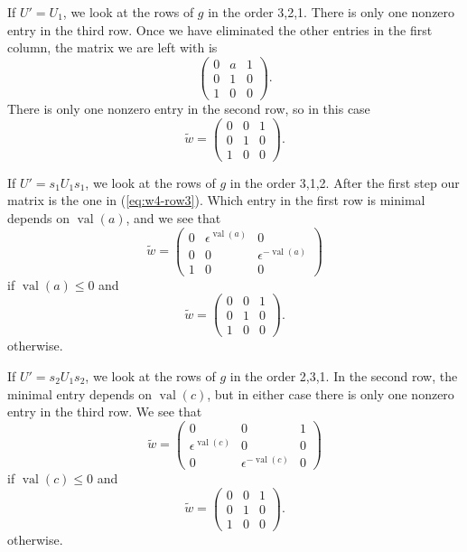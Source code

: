 \documentclass{amsart}
\theoremstyle{definition}
\def\e{\epsilon}
\def\w{\widetilde{w}}
\def\val{\mathop{\mathrm{val}}}
\begin{document}
  If $U' = U_1$, we look at the rows of $g$ in the order 3,2,1.  There is only
  one nonzero entry in the third row.  Once we have eliminated the other
  entries in the first column, the matrix we are left with is
  \begin{equation} \label{eq:w4-row3}
    \begin{pmatrix}
      0 & a & 1 \\ 
      0 & 1 & 0 \\
      1 & 0 & 0
    \end{pmatrix}.
  \end{equation}
  There is only one nonzero entry in the second row, so in this case
  \begin{equation*}\w = \begin{pmatrix}
      0 & 0 & 1 \\
      0 & 1 & 0 \\
      1 & 0 & 0
    \end{pmatrix}.
  \end{equation*}

  If $U' = s_1 U_1 s_1$, we look at the rows of $g$ in the order 3,1,2.  After
  the first step our matrix is the one in (\ref{eq:w4-row3}).  Which entry in
  the first row is minimal depends on $\val(a)$, and we see that
  \begin{equation*}
    \w = \begin{pmatrix}
      0 & \e^{\val(a)} & 0 \\
      0 & 0 & \e^{-\val(a)}  \\
      1 & 0 & 0
    \end{pmatrix}
  \end{equation*}
  if $\val(a) \le 0$ and 
  \begin{equation*}\w = \begin{pmatrix}
      0 & 0 & 1 \\
      0 & 1 & 0 \\
      1 & 0 & 0
    \end{pmatrix}.
  \end{equation*}
  otherwise.
  
  If $U' = s_2 U_1 s_2$, we look at the rows of $g$ in the order 2,3,1.  In the
  second row, the minimal entry depends on $\val(c)$, but in either case there
  is only one nonzero entry in the third row.  We see that
  \begin{equation*}
    \w = \begin{pmatrix}
      0 & 0 & 1 \\
      \e^{\val(c)} & 0 & 0\\
      0 & \e^{-\val(c)}  & 0
    \end{pmatrix}
  \end{equation*}
  if $\val(c) \le 0$ and 
  \begin{equation*}\w = \begin{pmatrix}
      0 & 0 & 1 \\
      0 & 1 & 0 \\
      1 & 0 & 0
    \end{pmatrix}.
  \end{equation*}
  otherwise.
\end{document}
